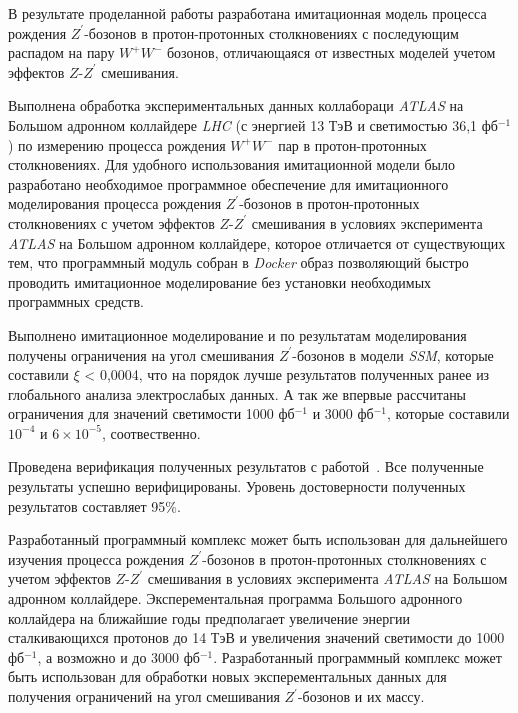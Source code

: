 В результате проделанной работы разработана имитационная модель процесса рождения ${Z}^{\prime}$-бозонов в протон-протонных столкновениях с последующим распадом на пару ${W}^{+}{W}^{-}$ бозонов, отличающаяся от известных моделей учетом эффектов $Z$-${Z}^{\prime}$ смешивания.

Выполнена обработка экспериментальных данных коллабораци \textit{ATLAS} на Большом адронном коллайдере \textit{LHC} (с энергией 13 ТэВ и светимостью 36,1 фб${}^{−1}$) по измерению процесса рождения ${W}^{+}$${W}^{-}$ пар в протон-протонных столкновениях.
Для удобного использования имитационной модели было разработано необходимое программное обеспечение для имитационного моделирования процесса
рождения ${Z}^{\prime}$-бозонов в протон-протонных столкновениях с учетом эффектов $Z$-${Z}^{\prime}$ смешивания в условиях эксперимента \textit{ATLAS} на Большом адронном коллайдере, которое отличается от существующих тем, что программный модуль собран в \textit{Docker} образ позволяющий быстро проводить имитационное моделирование без установки необходимых программных средств.

Выполнено имитационное моделирование и по результатам моделирования получены ограничения на угол смешивания ${Z}^{\prime}$-бозонов в модели \textit{SSM}, которые составили $\xi$ < 0,0004, что на порядок лучше результатов полученных ранее из глобального анализа электрослабых данных. А так же впервые рассчитаны ограничения для значений светимости 1000 фб${}^{−1}$ и 3000 фб${}^{−1}$, которые составили ${10}^{-4}$ и $6\times{10}^{-5}$, соотвественно.

Проведена верификация полученных результатов с
работой~\cite{2part-pankov}. Все полученные результаты успешно верифицированы. Уровень достоверности полученных результатов составляет 95\%.

Разработанный программный комплекс может быть использован для дальнейшего изучения процесса рождения ${Z}^{\prime}$-бозонов в протон-протонных столкновениях с учетом эффектов $Z$-${Z}^{\prime}$ смешивания в условиях эксперимента \textit{ATLAS} на Большом адронном коллайдере. Эксперементальная программа Большого адронного коллайдера на  ближайшие годы предполагает увеличение энергии сталкивающихся протонов до 14 ТэВ и увеличения значений светимости до 1000 фб${}^{−1}$, а возможно и до 3000 фб${}^{−1}$. Разработанный программный комплекс может быть использован для обработки новых эксперементальных данных для получения ограничений на угол смешивания ${Z}^{\prime}$-бозонов и их массу.